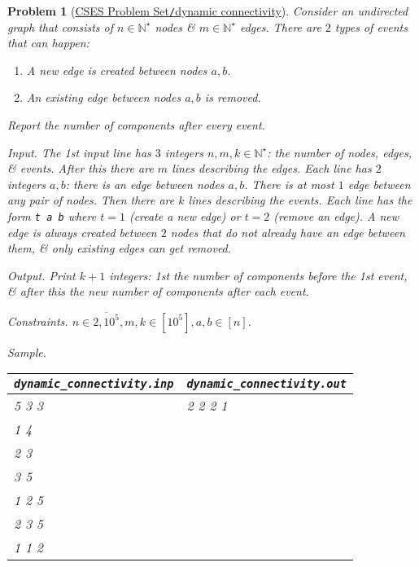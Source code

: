 \documentclass{article}
\newtheorem{problem}{Problem}
\begin{document}
\begin{problem}[\href{https://cses.fi/problemset/task/2133}{CSES Problem Set{\tt/}dynamic connectivity}]
    Consider an undirected graph that consists of $n\in\mathbb{N}^\star$ nodes \& $m\in\mathbb{N}^\star$ edges. There are $2$ types of events that can happen:
    \begin{enumerate}
        \item A new edge is created between nodes $a,b$.
        \item An existing edge between nodes $a,b$ is removed.
    \end{enumerate}
    Report the number of components after every event.
    \item {\sf Input.} The 1st input line has $3$ integers $n,m,k\in\mathbb{N}^\star$: the number of nodes, edges, \& events. After this there are $m$ lines describing the edges. Each line has $2$ integers $a,b$: there is an edge between nodes $a,b$. There is at most $1$ edge between any pair of nodes. Then there are $k$ lines describing the events. Each line has the form {\tt t a b} where $t = 1$ (create a new edge) or $t = 2$ (remove an edge). A new edge is always created between $2$ nodes that do not already have an edge between them, \& only existing edges can get removed.
    \item {\sf Output.} Print $k + 1$ integers: 1st the number of components before the 1st event, \& after this the new number of components after each event.
    \item {\sf Constraints.} $n\in\overline{2,10^5},m,k\in[10^5],a,b\in[n]$.
    \item {\sf Sample.}
    \begin{table}[H]
        \centering
        \begin{tabular}{|l|l|}
            \hline
            \verb|dynamic_connectivity.inp| & \verb|dynamic_connectivity.out| \\
            \hline
            5 3 3 & 2 2 2 1 \\
            1 4 & \\
            2 3 & \\
            3 5 & \\
            1 2 5 & \\
            2 3 5 & \\
            1 1 2 & \\
            \hline
        \end{tabular}
    \end{table}
\end{problem}
\end{document}
